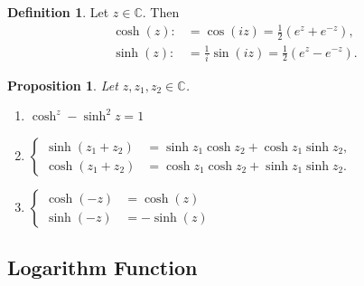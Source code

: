 \documentclass[12pt,openany]{book}
\newtheorem{proposition}[theorem]{Proposition}
\theoremstyle{definition}
\newtheorem{definition}{Definition}[chapter]
\newcommand{\C}{\mathbb{C}}
\newcommand{\of}[1]{\left( #1 \right)}
\begin{document}
	\begin{tcolorbox}[colback=white,colframe=defcolor,arc=5pt,title={\color{white}\bf Complex Hyperbolic}]
		\begin{definition}
			Let $z\in\C$. Then \begin{align*}
			\cosh\of{z}:&=\cos(iz)=\frac{1}{2}(e^z+e^{-z}),\\
			\sinh\of{z}:&=\frac{1}{i}\sin(iz)=\frac{1}{2}(e^z-e^{-z}).
			\end{align*}
		\end{definition}
	\end{tcolorbox}
	\vspace{8pt}
	\begin{tcolorbox}[colback=white,colframe=procolor,arc=5pt,title={\color{white}\bf Properties of Complex Hyperbolic}]
		\begin{proposition}
			Let $z,z_1,z_2\in\C$. \begin{enumerate}[(1)]
				\item $\cosh^z-\sinh^2z=1$
				\item $\begin{cases}
				\sinh(z_1+z_2)&=\sinh z_1\cosh z_2+\cosh z_1\sinh z_2,\\
				\cosh(z_1+z_2)&=\cosh z_1\cosh z_2+\sinh z_1\sinh z_2.
				\end{cases}$
				\item $\begin{cases}
				\cosh(-z)&=\cosh(z)\\
				\sinh(-z)&=-\sinh(z)
				\end{cases}$
			\end{enumerate}
		\end{proposition}
	\end{tcolorbox}
	
	\newpage
	\subsection{Logarithm Function}
	
\end{document}
